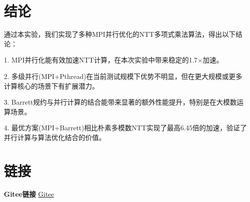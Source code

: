 \documentclass[a4paper]{article}
\begin{document}
\section{结论}
通过本实验，我们实现了多种MPI并行优化的NTT多项式乘法算法，得出以下结论：

1. MPI并行化能有效加速NTT计算，在本次实验中带来稳定的1.7×加速。

2. 多级并行(MPI+Pthread)在当前测试规模下优势不明显，但在更大规模或更多计算核心的场景下有扩展潜力。

3. Barrett规约与并行计算的结合能带来显著的额外性能提升，特别是在大模数运算场景。

4. 最优方案(MPI+Barrett)相比朴素多模数NTT实现了最高6.45倍的加速，验证了并行计算与算法优化结合的价值。


\section{链接}
\textbf{Gitee链接}  \href{https://gitee.com/sky_whale/parallel-programming-with-nku}{Gitee}
\end{document}
